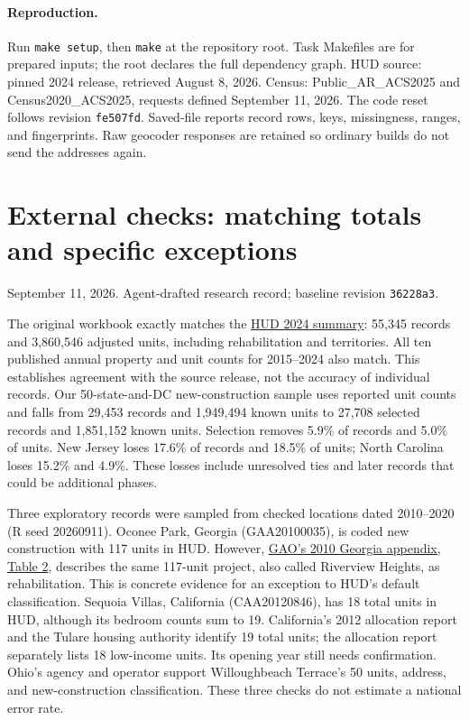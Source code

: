 \documentclass[11pt]{article}
\begin{document}
\paragraph{Reproduction.} Run \texttt{make setup}, then \texttt{make} at the
repository root. Task Makefiles are for prepared inputs; the root declares the
full dependency graph. HUD source: pinned 2024 release, retrieved August 8, 2026.
Census: Public\_AR\_ACS2025 and Census2020\_ACS2025, requests defined September 11,
2026. The code reset follows revision \texttt{fe507fd}. Saved-file reports record
rows, keys, missingness, ranges, and fingerprints. Raw geocoder responses are
retained so ordinary builds do not send the addresses again.
\clearpage
\section*{External checks: matching totals and specific exceptions}
\noindent September 11, 2026. Agent-drafted research record; baseline
revision \texttt{36228a3}.

The original workbook exactly matches the
\href{https://www.huduser.gov/portal/Datasets/lihtc/LIHTC-2024-Tables.pdf}{HUD 2024 summary}:
55,345 records and 3,860,546 adjusted units, including rehabilitation and
territories. All ten published annual property and unit counts for 2015--2024
also match. This establishes agreement with the source release, not the accuracy
of individual records. Our 50-state-and-DC new-construction sample uses reported
unit counts and falls from 29,453 records and 1,949,494 known units to 27,708
selected records and 1,851,152 known units. Selection removes 5.9\% of records
and 5.0\% of units. New Jersey loses 17.6\% of records and 18.5\% of units;
North Carolina loses 15.2\% and 4.9\%. These losses include unresolved ties and
later records that could be additional phases.

Three exploratory records were sampled from checked locations dated 2010--2020
(R seed 20260911). Oconee Park, Georgia (GAA20100035), is coded new construction
with 117 units in HUD. However,
\href{https://www.gao.gov/assets/a204076.html}{GAO's 2010 Georgia appendix, Table 2},
describes the same 117-unit project, also called Riverview Heights, as
rehabilitation. This is concrete evidence for an exception to HUD's default
classification. Sequoia Villas, California (CAA20120846), has 18 total units in
HUD, although its bedroom counts sum to 19. California's 2012 allocation report
and the Tulare housing authority identify 19 total units; the allocation report
separately lists 18 low-income units. Its opening year still needs confirmation.
Ohio's agency and operator support Willoughbeach Terrace's 50 units, address,
and new-construction classification. These three checks do not estimate a
national error rate.
\end{document}
